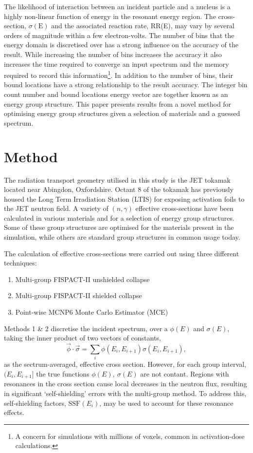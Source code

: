 The likelihood of interaction between an incident particle and a nucleus is a highly non-linear function of energy in the resonant energy region. The cross-section, $\sigma(\mathrm{E})$ and the associated reaction rate, RR(E), may vary by several orders of magnitude within a few electron-volts. The number of bins that the energy domain is discretised over has a strong influence on the accuracy of the result. While increasing the number of bins increases the accuracy it also increases the time required to converge an input spectrum and the memory required to record this information\footnote{A concern for simulations with millions of voxels, common in activation-dose calculations.}. In addition to the number of bins, their bound locations have a strong relationship to the result accuracy. The integer bin count number and bound locations energy vector are together known as an energy group structure. This paper presents results from a novel method for optimising energy group structures given a selection of materials and a guessed spectrum.

\section{Method}
\label{S:2}
The radiation transport geometry utilised in this study is the JET tokamak located near Abingdon, Oxfordshire. Octant 8 of the tokamak has previously housed the Long Term Irradiation Station (LTIS) for exposing activation foils to the JET neutron field. A variety of $(n,\gamma)$ effective cross-sections have been calculated in various materials and for a selection of energy group structures. Some of these group structures are optimised for the materials present in the simulation, while others are standard group structures in common usage today. 

The calculation of effective cross-sections were carried out using three different techniques:
\begin{enumerate}
\item Multi-group FISPACT-II unshielded collapse
\item Multi-group FISPACT-II shielded collapse
\item Point-wise MCNP6 Monte Carlo Estimator (MCE)
\end{enumerate}

Methods 1 \& 2 discretise the incident spectrum, over a  $\phi(E)$ and $\sigma(E)$, taking the inner product of two vectors of constants,
$$\vec{\phi} \cdot \vec{\sigma} = \sum_i \phi(E_i , E_{i+1}) \sigma(E_i , E_{i+1}),$$
as the sectrum-averaged, effective cross section. However, for each group interval, $(E_{i}, E_{i+1}]$ the true functions $\phi(E),\ \sigma(E)$ are not contant. Regions with resonances in the cross section cause local decreases in the neutron flux, resulting in significant `self-shielding' errors with the multi-group method. To address this, self-shielding factors, $\mathrm{SSF}(E_i)$, may be used to account for these resonance effects. 

